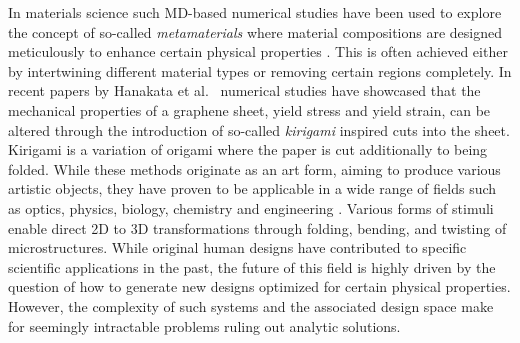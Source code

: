 In materials science such \acrshort{MD}-based numerical studies have been used
to explore the concept of so-called \textit{metamaterials} where material
compositions are designed meticulously to enhance certain physical properties
\cite{PhysRevLett.121.255304, PhysRevResearch.2.042006, graphene/hBN, Mao, Yang,
Forte}. This is often achieved either by intertwining different material types
or removing certain regions completely. In recent papers by Hanakata et al.\
\cite{PhysRevLett.121.255304, PhysRevResearch.2.042006}
numerical studies have showcased that the mechanical properties of a graphene
sheet, yield stress and yield strain, can be altered through the introduction of
so-called \textit{kirigami} inspired cuts into the sheet. Kirigami is a
variation of origami where the paper is cut additionally to being folded. While
these methods originate as an art form, aiming to produce various artistic
objects, they have proven to be applicable in a wide range of fields such as
optics, physics, biology, chemistry and engineering
\cite{chen_kirigamiorigami_2020}. Various forms of stimuli enable direct 2D to
3D transformations through folding, bending, and twisting of microstructures.
While original human designs have contributed to specific scientific
applications in the past, the future of this field is highly driven by the
question of how to generate new designs optimized for certain physical
properties. However, the complexity of such systems and the associated design
space make for seemingly intractable problems ruling out analytic solutions.


